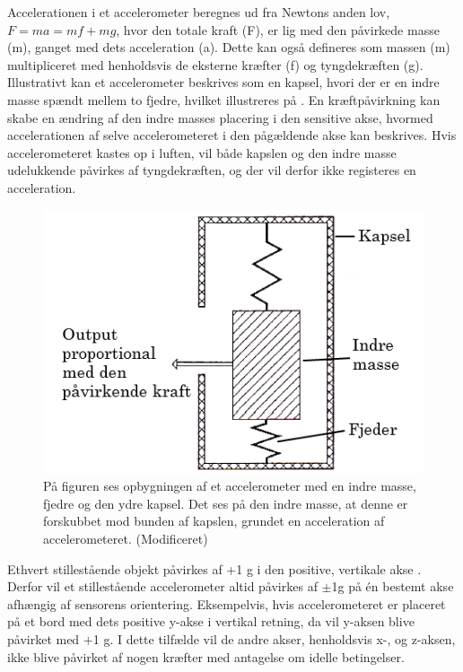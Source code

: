 Accelerationen i et accelerometer beregnes ud fra Newtons anden lov, $F=ma=mf+mg$, hvor den totale kraft (F), er lig med den påvirkede masse (m), ganget med dets acceleration (a). Dette kan også defineres som massen (m) multipliceret med henholdsvis de eksterne kræfter (f) og tyngdekræften (g). \citep{TittertonWeston2004,Academic2016d} \newline
Illustrativt kan et accelerometer beskrives som en kapsel, hvori der er en indre masse spændt mellem to fjedre, hvilket illustreres på . En kræftpåvirkning kan skabe en ændring af den indre masses placering i den sensitive akse, hvormed accelerationen af selve accelerometeret i den pågældende akse kan beskrives. Hvis accelerometeret kastes op i luften, vil både kapslen og den indre masse udelukkende påvirkes af tyngdekræften, og der vil derfor ikke registeres en acceleration.\citep{TittertonWeston2004,Academic2016d}
\begin{figure}[H]
	\centering
	\includegraphics[scale=0.5]{figures/bProblemloesning/accelerometer_basic.png}
	\caption{På figuren ses opbygningen af et accelerometer med en indre masse, fjedre og den ydre kapsel. Det ses på den indre masse, at denne er forskubbet mod bunden af kapslen, grundet en acceleration af accelerometeret. \citep{TittertonWeston2004} (Modificeret)}
	\label{acc_simpelt}
\end{figure}\vspace{-.2cm}
Ethvert stillestående objekt påvirkes af +1 g i den positive, vertikale akse \citep{Serway2010}. Derfor vil et stillestående accelerometer altid påvirkes af $\pm$1g på én bestemt akse afhængig af sensorens orientering. Eksempelvis, hvis accelerometeret er placeret på et bord med dets positive y-akse i vertikal retning, da vil y-aksen blive påvirket med $+$1 g. I dette tilfælde vil de andre akser, henholdsvis x-, og z-aksen, ikke blive påvirket af nogen kræfter med antagelse om idelle betingelser. 


